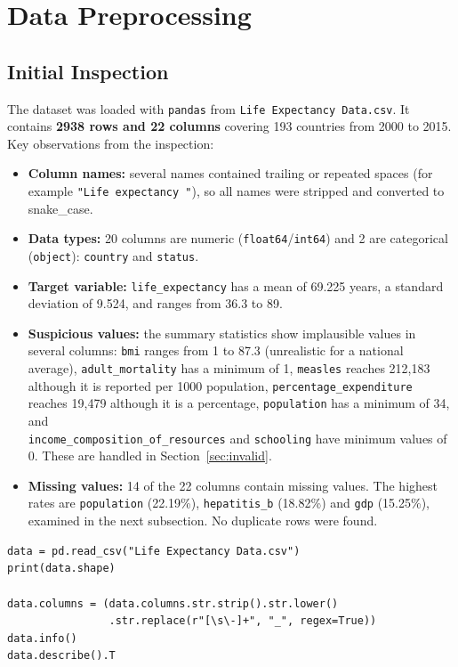 \documentclass[12pt,a4paper]{article}
\begin{document}
\section{Data Preprocessing}
\subsection{Initial Inspection}
The dataset was loaded with \texttt{pandas} from \texttt{Life Expectancy Data.csv}.
It contains \textbf{2938 rows and 22 columns} covering 193 countries from 2000 to 2015.
Key observations from the inspection:
\begin{itemize}
  \item \textbf{Column names:} several names contained trailing or repeated
        spaces (for example \texttt{"Life expectancy "}), so all names were
        stripped and converted to snake\_case.
  \item \textbf{Data types:} 20 columns are numeric (\texttt{float64}/\texttt{int64}) and
        2 are categorical (\texttt{object}): \texttt{country} and \texttt{status}.
  \item \textbf{Target variable:} \texttt{life\_expectancy} has a mean of 69.225 years,
        a standard deviation of 9.524, and ranges from 36.3 to 89.
  \item \textbf{Suspicious values:} the summary statistics show implausible
        values in several columns: \texttt{bmi} ranges from 1 to 87.3 (unrealistic
        for a national average), \texttt{adult\_mortality} has a minimum of 1,
        \texttt{measles} reaches 212,183 although it is reported per 1000
        population, \texttt{percentage\_expenditure} reaches 19,479 although it is
        a percentage, \texttt{population} has a minimum of 34, and \\
        \texttt{income\_composition\_of\_resources} and \texttt{schooling} have
        minimum values of 0. These are handled in
        Section~\ref{sec:invalid}.
  \item \textbf{Missing values:} 14 of the 22 columns contain missing values.
        The highest rates are \texttt{population} (22.19\%),
        \texttt{hepatitis\_b} (18.82\%) and \texttt{gdp} (15.25\%), examined in
        the next subsection. No duplicate rows were found.
\end{itemize}

\begin{lstlisting}
data = pd.read_csv("Life Expectancy Data.csv")
print(data.shape)

data.columns = (data.columns.str.strip().str.lower()
                .str.replace(r"[\s\-]+", "_", regex=True))
data.info()
data.describe().T
\end{lstlisting}
\end{document}

